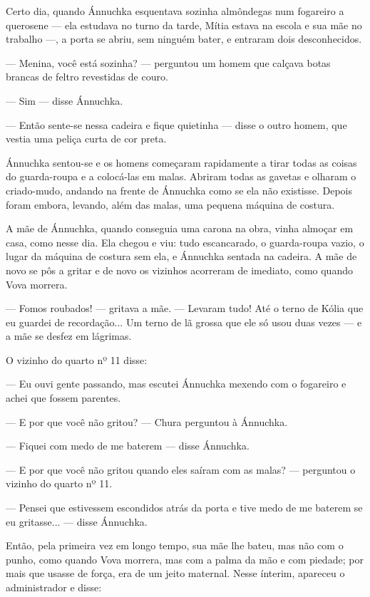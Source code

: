 Certo dia, quando Ánnuchka esquentava sozinha almôndegas num fogareiro a
querosene --- ela estudava no turno da tarde, Mítia estava na escola e
sua mãe no trabalho ---, a porta se abriu, sem ninguém bater, e entraram
dois desconhecidos.

--- Menina, você está sozinha? --- perguntou um homem que calçava botas
brancas de feltro revestidas de couro.

--- Sim --- disse Ánnuchka.

--- Então sente-se nessa cadeira e fique quietinha --- disse o outro
homem, que vestia uma peliça curta de cor preta.

Ánnuchka sentou-se e os homens começaram rapidamente a tirar todas as
coisas do guarda-roupa e a colocá-las em malas. Abriram todas as gavetas
e olharam o criado-mudo, andando na frente de Ánnuchka como se ela não
existisse. Depois foram embora, levando, além das malas, uma pequena
máquina de costura.

A mãe de Ánnuchka, quando conseguia uma carona na obra, vinha almoçar em
casa, como nesse dia. Ela chegou e viu: tudo escancarado, o guarda-roupa
vazio, o lugar da máquina de costura sem ela, e Ánnuchka sentada na
cadeira. A mãe de novo se pôs a gritar e de novo os vizinhos acorreram
de imediato, como quando Vova morrera.

--- Fomos roubados! --- gritava a mãe. --- Levaram tudo! Até o terno de
Kólia que eu guardei de recordação... Um terno de lã grossa que ele só
usou duas vezes --- e a mãe se desfez em lágrimas.

O vizinho do quarto nº 11 disse:

--- Eu ouvi gente passando, mas escutei Ánnuchka mexendo com o fogareiro
e achei que fossem parentes.

--- E por que você não gritou? --- Chura perguntou à Ánnuchka.

--- Fiquei com medo de me baterem --- disse Ánnuchka.

--- E por que você não gritou quando eles saíram com as malas? ---
perguntou o vizinho do quarto nº 11.

--- Pensei que estivessem escondidos atrás da porta e tive medo de me
baterem se eu gritasse... --- disse Ánnuchka.

Então, pela primeira vez em longo tempo, sua mãe lhe bateu, mas não com
o punho, como quando Vova morrera, mas com a palma da mão e com piedade;
por mais que usasse de força, era de um jeito maternal. Nesse ínterim,
apareceu o administrador e disse:

